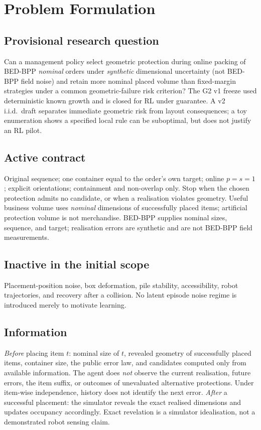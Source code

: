 \section{Problem Formulation}

\subsection*{Provisional research question}
Can a management policy select geometric protection during online packing of
BED-BPP \emph{nominal} orders under \emph{synthetic} dimensional uncertainty
(not BED-BPP field noise) and retain more nominal placed volume than
fixed-margin strategies under a common geometric-failure risk criterion?
The G2 v1 freeze used deterministic known growth and is closed for RL under
guarantee. A v2 i.i.d.\ draft separates immediate geometric risk from layout
consequences; a toy enumeration shows a specified local rule can be suboptimal,
but does not justify an RL pilot.

\subsection*{Active contract}
Original sequence; one container equal to the order's own target; online
$p=s=1$; explicit orientations; containment and non-overlap only. Stop when the
chosen protection admits no candidate, or when a realisation violates geometry.
Useful business volume uses \emph{nominal} dimensions of successfully placed
items; artificial protection volume is not merchandise. BED-BPP supplies
nominal sizes, sequence, and target; realisation errors are synthetic and are
not BED-BPP field measurements.

\subsection*{Inactive in the initial scope}
Placement-position noise, box deformation, pile stability, accessibility,
robot trajectories, and recovery after a collision. No latent episode noise
regime is introduced merely to motivate learning.

\subsection*{Information}
\emph{Before} placing item $t$: nominal size of $t$, revealed geometry of
successfully placed items, container size, the public error law, and candidates
computed only from available information. The agent does \emph{not} observe the
current realisation, future errors, the item suffix, or outcomes of unevaluated
alternative protections. Under item-wise independence, history does not identify
the next error.
\emph{After} a successful placement: the simulator reveals the exact realised
dimensions and updates occupancy accordingly. Exact revelation is a simulator
idealisation, not a demonstrated robot sensing claim.

